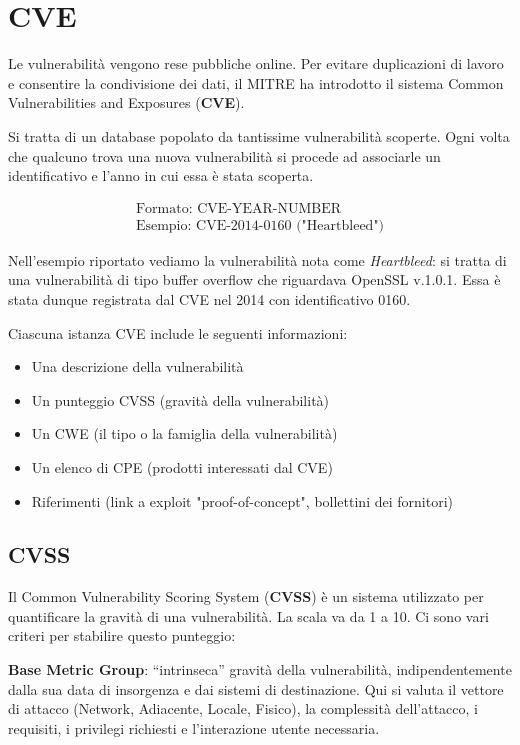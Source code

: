 \section{CVE}
Le vulnerabilità vengono rese pubbliche online. Per evitare duplicazioni di 
lavoro e consentire la condivisione dei dati, il MITRE ha introdotto il 
sistema Common Vulnerabilities and Exposures (\textbf{CVE}).

Si tratta di un database popolato da tantissime vulnerabilità scoperte. Ogni 
volta che qualcuno trova una nuova vulnerabilità si procede ad associarle un 
identificativo e l'anno in cui essa è stata scoperta.

\begin{gather*}
    \text{Formato: CVE-YEAR-NUMBER} \\
    \text{Esempio: CVE-2014-0160 ("Heartbleed")}
\end{gather*}

Nell'esempio riportato vediamo la vulnerabilità nota come \textit{Heartbleed}: si
tratta di una vulnerabilità di tipo buffer overflow che riguardava OpenSSL v.1.0.1.
Essa è stata dunque registrata dal CVE nel 2014 con identificativo 0160.

Ciascuna istanza CVE include le seguenti informazioni:

\begin{itemize}
    \item Una descrizione della vulnerabilità
    \item Un punteggio CVSS (gravità della vulnerabilità)
    \item Un CWE (il tipo o la famiglia della vulnerabilità)
    \item Un elenco di CPE (prodotti interessati dal CVE)
    \item Riferimenti (link a exploit "proof-of-concept", bollettini dei fornitori)
\end{itemize}

\subsection{CVSS}

Il Common Vulnerability Scoring System (\textbf{CVSS}) è un sistema utilizzato per 
quantificare la gravità di una vulnerabilità. La scala va da 1 a 10. 
Ci sono vari criteri per stabilire questo punteggio: 

\textbf{Base Metric Group}: “intrinseca” gravità della vulnerabilità,
indipendentemente dalla sua data di insorgenza e dai sistemi di destinazione.
Qui si valuta il vettore di attacco (Network, Adiacente, Locale, Fisico), la 
complessità dell'attacco, i requisiti, i privilegi richiesti e l'interazione
utente necessaria.

